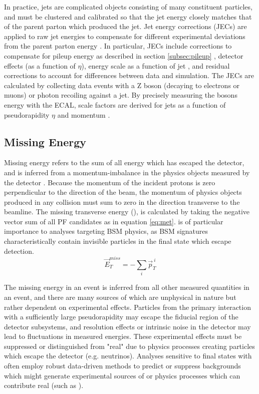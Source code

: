 In practice, jets are complicated objects consisting of many constituent particles, and must be clustered and calibrated so that the jet energy closely matches that of the parent parton which produced the jet. Jet energy corrections (JECs) are applied to raw jet energies to compensate for different experimental deviations from the parent parton energy \cite{Khachatryan:2016kdb,CMS-DP-2016-020}. In particular, JECs include corrections to compensate for pileup energy as described in section \ref{subsec:pileup} \cite{Cacciari:2007fd}, detector effects (as a function of $\eta$), energy scale as a function of jet \pt, and residual corrections to account for differences between data and simulation. The JECs are calculated by collecting data events with a Z boson (decaying to electrons or muons) or photon recoiling against a jet. By precisely measuring the bosons energy with the ECAL, scale factors are derived for jets as a function of pseudorapidity $\eta$ and momentum \pt. 

\subsection{Missing Energy}
\label{subsec:met}
Missing energy refers to the sum of all energy which has escaped the detector, and is inferred from a momentum-imbalance in the physics objects measured by the detector \cite{Chatrchyan:2011tn}. Because the momentum of the incident protons is zero perpendicular to the direction of the beam, the momentum of physics objects produced in any collision must sum to zero in the direction transverse to the beamline. The missing transverse energy (\MET), is calculated by taking the negative vector sum of all PF candidates as in equation \ref{eq:met}. \MET is of particular importance to analyses targeting BSM physics, as BSM signatures characteristically contain invisible particles in the final state which escape detection.
\begin{equation}
	\label{eq:met}
	\vec{E}_T^{miss}=-\sum_i^{} \vec{p}_T^{\: i}
\end{equation}

The missing energy in an event is inferred from all other measured quantities in an event, and there are many sources of \MET which are unphysical in nature but rather dependent on experimental effects. Particles from the primary interaction with a sufficiently large pseudorapidity may escape the fiducial region of the detector subsystems, and resolution effects or intrinsic noise in the detector may lead to fluctuations in measured energies. These experimental effects must be suppressed or distinguished from "real" \MET due to physics processes creating particles which escape the detector (e.g. neutrinos). Analyses sensitive to final states with \MET often employ robust data-driven methods to predict or suppress backgrounds which might generate experimental sources of \MET or physics processes which can contribute real \MET (such as \znunu).

